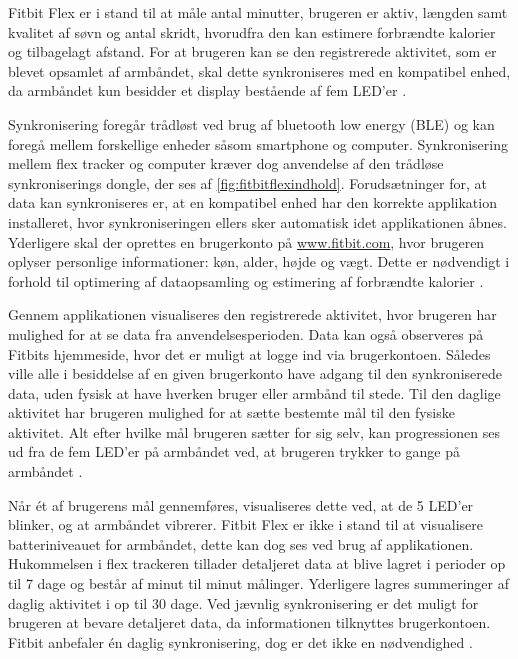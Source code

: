 \noindent
Fitbit Flex er i stand til at måle antal minutter, brugeren er aktiv, længden samt kvalitet af søvn og antal skridt, hvorudfra den kan estimere forbrændte kalorier og tilbagelagt afstand. 
For at brugeren kan se den registrerede aktivitet, som er blevet opsamlet af armbåndet, skal dette synkroniseres med en kompatibel enhed, da armbåndet kun besidder et display bestående af fem LED'er \citep{fitbitflex}. 

Synkronisering foregår trådløst ved brug af bluetooth low energy (BLE) og kan foregå mellem forskellige enheder såsom smartphone og computer. 
Synkronisering mellem flex tracker og computer kræver dog anvendelse af den trådløse synkroniserings dongle, der ses af \autoref{fig:fitbitflexindhold}.
Forudsætninger for, at data kan synkroniseres er, at en kompatibel enhed har den korrekte applikation installeret, hvor synkroniseringen ellers sker automatisk idet applikationen åbnes.  
Yderligere skal der oprettes en brugerkonto på \url{www.fitbit.com}, hvor brugeren oplyser personlige informationer: køn, alder, højde og vægt. Dette er nødvendigt i forhold til optimering af dataopsamling og estimering af forbrændte kalorier \citep{fitbitflex}.  

Gennem applikationen visualiseres den registrerede aktivitet, hvor brugeren har mulighed for at se data fra anvendelsesperioden. Data kan også observeres på Fitbits hjemmeside, hvor det er muligt at logge ind via brugerkontoen. 
Således ville alle i besiddelse af en given brugerkonto have adgang til den synkroniserede data, uden fysisk at have hverken bruger eller armbånd til stede. 
Til den daglige aktivitet har brugeren mulighed for at sætte bestemte mål til den fysiske aktivitet. Alt efter hvilke mål brugeren sætter for sig selv, kan progressionen ses ud fra de fem LED'er på armbåndet ved, at brugeren trykker to gange på armbåndet \citep{fitbitflex}.   

Når ét af brugerens mål gennemføres, visualiseres dette ved, at de 5 LED'er blinker, og at armbåndet vibrerer. 
Fitbit Flex er ikke i stand til at visualisere batteriniveauet for armbåndet, dette kan dog ses ved brug af applikationen. 
Hukommelsen i flex trackeren tillader detaljeret data at blive lagret i perioder op til 7 dage og består af minut til minut målinger.  
Yderligere lagres summeringer af daglig aktivitet i op til 30 dage. 
Ved jævnlig synkronisering er det muligt for brugeren at bevare detaljeret data, da informationen tilknyttes brugerkontoen. 
Fitbit anbefaler én daglig synkronisering, dog er det ikke en nødvendighed \citep{fitbitflex}. 

